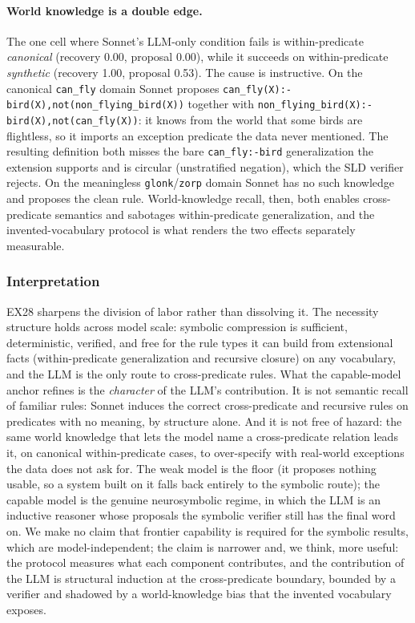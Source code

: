 \documentclass[10pt,conference]{IEEEtran}
\begin{document}
\paragraph{World knowledge is a double edge.}
The one cell where Sonnet's LLM-only condition fails is within-predicate \emph{canonical} (recovery 0.00, proposal 0.00), while it succeeds on within-predicate \emph{synthetic} (recovery 1.00, proposal 0.53). The cause is instructive. On the canonical \texttt{can\_fly} domain Sonnet proposes \texttt{can\_fly(X):-\allowbreak bird(X),\allowbreak not(non\_flying\_bird(X))} together with \texttt{non\_flying\_bird(X):-\allowbreak bird(X),\allowbreak not(can\_fly(X))}: it knows from the world that some birds are flightless, so it imports an exception predicate the data never mentioned. The resulting definition both misses the bare \texttt{can\_fly:-bird} generalization the extension supports and is circular (unstratified negation), which the SLD verifier rejects. On the meaningless \texttt{glonk}/\texttt{zorp} domain Sonnet has no such knowledge and proposes the clean rule. World-knowledge recall, then, both enables cross-predicate semantics and sabotages within-predicate generalization, and the invented-vocabulary protocol is what renders the two effects separately measurable.

\subsubsection{Interpretation}
EX28 sharpens the division of labor rather than dissolving it. The necessity structure holds across model scale: symbolic compression is sufficient, deterministic, verified, and free for the rule types it can build from extensional facts (within-predicate generalization and recursive closure) on any vocabulary, and the LLM is the only route to cross-predicate rules. What the capable-model anchor refines is the \emph{character} of the LLM's contribution. It is not semantic recall of familiar rules: Sonnet induces the correct cross-predicate and recursive rules on predicates with no meaning, by structure alone. And it is not free of hazard: the same world knowledge that lets the model name a cross-predicate relation leads it, on canonical within-predicate cases, to over-specify with real-world exceptions the data does not ask for. The weak model is the floor (it proposes nothing usable, so a system built on it falls back entirely to the symbolic route); the capable model is the genuine neurosymbolic regime, in which the LLM is an inductive reasoner whose proposals the symbolic verifier still has the final word on. We make no claim that frontier capability is required for the symbolic results, which are model-independent; the claim is narrower and, we think, more useful: the protocol measures what each component contributes, and the contribution of the LLM is structural induction at the cross-predicate boundary, bounded by a verifier and shadowed by a world-knowledge bias that the invented vocabulary exposes.
\end{document}
